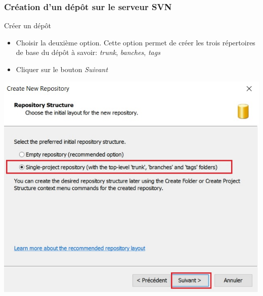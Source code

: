 \documentclass{beamer}
\begin{document}
\begin{frame}
\frametitle{Création d'un dépôt sur le serveur SVN}
\begin{block}{Créer un dépôt}
\begin{itemize}
\item Choisir la deuxième option. Cette option permet de créer les trois répertoires de base du dépôt à savoir: \alert{\textit{trunk}}, \alert{\textit{banches}}, \alert{\textit{tags}}
\item Cliquer sur le bouton \alert{\textit{Suivant}}
\end{itemize}
\end{block}
\includegraphics[scale=.5]{../images/server8.jpg}
\end{frame}
\end{document}

